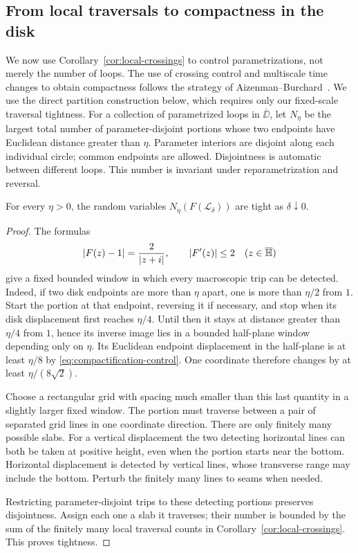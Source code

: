 \subsection{From local traversals to compactness in the disk}

We now use Corollary~\ref{cor:local-crossings} to control parametrizations,
not merely the number of loops. The use of crossing control and
multiscale time changes to obtain compactness follows the strategy of
Aizenman--Burchard~\cite[Lemma~2.4 and Section~4]{AB}. We use the direct
partition construction below, which requires only our fixed-scale
traversal tightness. For a collection of parametrized loops
in $\overline{\DD}$, let $N_\eta$ be the largest total number of
parameter-disjoint portions whose two endpoints have Euclidean
distance greater than $\eta$.  Parameter interiors are disjoint along each individual circle; common
endpoints are allowed. Disjointness is automatic between different loops.
This number is invariant under reparametrization and reversal.

\begin{lemma}
\label{lem:disk-trips}
For every $\eta>0$, the random variables
$N_\eta(F(\mathcal L_\delta))$ are tight as $\delta\downarrow0$.
\end{lemma}

\begin{proof}
The formulas
\begin{equation}
 |F(z)-1|=\frac{2}{|z+i|},
 \qquad |F'(z)|\le2\quad(z\in\overline{\mathbb H})
 \label{eq:compactification-control}
\end{equation}
give a fixed bounded window in which every macroscopic trip can be
detected.  Indeed, if two disk endpoints are more than $\eta$ apart,
one is more than $\eta/2$ from $1$.  Start the portion at that endpoint,
reversing it if necessary, and stop when its disk displacement first
reaches $\eta/4$.  Until then it stays at distance greater than
$\eta/4$ from $1$, hence its inverse image lies in a bounded half-plane
window depending only on $\eta$.  Its Euclidean endpoint displacement
in the half-plane is at least $\eta/8$ by
\eqref{eq:compactification-control}.  One coordinate therefore changes
by at least $\eta/(8\sqrt2)$.

Choose a rectangular grid with spacing much smaller than this last
quantity in a slightly larger fixed window.  The portion must traverse
between a pair of separated grid lines in one coordinate direction.
There are only finitely many possible slabs.  For a vertical
displacement the two detecting horizontal lines can both be taken at
positive height, even when the portion starts near the bottom.
Horizontal displacement is detected by vertical lines, whose
transverse range may include the bottom.  Perturb the finitely many
lines to seams when needed.

Restricting parameter-disjoint trips to these detecting portions
preserves disjointness.  Assign each one a slab it traverses; their
number is bounded by the sum of the finitely many local traversal
counts in Corollary~\ref{cor:local-crossings}.  This proves tightness.
\end{proof}

